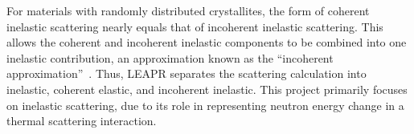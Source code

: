 \documentclass[../master.tex]{subfiles}
\begin{document}
			For materials with randomly distributed crystallites, the form of coherent inelastic scattering nearly equals that of incoherent inelastic scattering. This allows the coherent and incoherent inelastic components to be combined into one inelastic contribution, an approximation known as the ``incoherent approximation''~\cite{njoy,jesseholmes}. Thus, LEAPR separates the scattering calculation into inelastic, coherent elastic, and incoherent inelastic. This project primarily focuses on inelastic scattering, due to its role in representing neutron energy change in a thermal scattering interaction.
\end{document}
